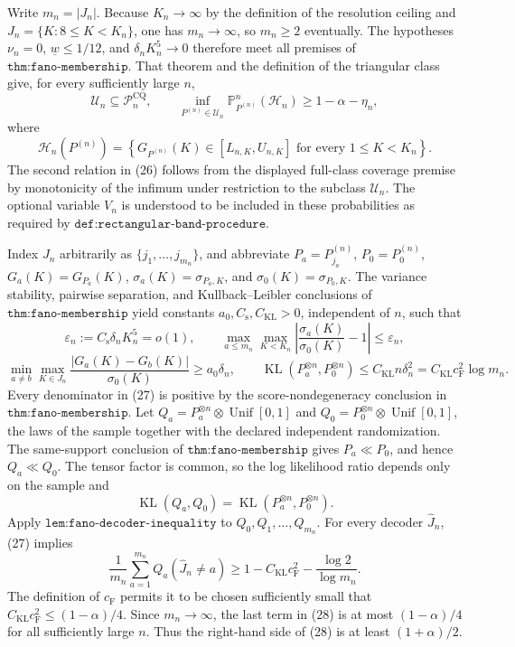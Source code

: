 Write \(m_n=|J_n|\).  Because \(K_n\to\infty\) by the definition of the resolution ceiling and \(J_n=\{K:8\leq K<K_n\}\), one has \(m_n\to\infty\), so \(m_n\geq2\) eventually.  The hypotheses \(\nu_n=0\), \(\underline w\leq1/12\), and \(\delta_nK_n^5\to0\) therefore meet all premises of \(\texttt{thm:fano-membership}\).  That theorem and the definition of the triangular class give, for every sufficiently large \(n\),
\[
 \mathcal U_n\subseteq\mathcal P_n^{\mathrm{CQ}},
 \qquad
 \inf_{P^{(n)}\in\mathcal U_n}\mathbb P_{P^{(n)}}^n(\mathcal H_n)
 \geq1-\alpha-\eta_n,                                      \tag{26}
\]
where
\[
 \mathcal H_n(P^{(n)})=
 \left\{G_{P^{(n)}}(K)\in[L_{n,K},U_{n,K}]
 \text{ for every }1\leq K<K_n\right\}.
\]
The second relation in (26) follows from the displayed full-class coverage premise by monotonicity of the infimum under restriction to the subclass \(\mathcal U_n\).  The optional variable \(V_n\) is understood to be included in these probabilities as required by \(\texttt{def:rectangular-band-procedure}\).

Index \(J_n\) arbitrarily as \(\{j_1,\ldots,j_{m_n}\}\), and abbreviate \(P_a=P_{j_a}^{(n)}\), \(P_0=P_0^{(n)}\), \(G_a(K)=G_{P_a}(K)\), \(\sigma_a(K)=\sigma_{P_a,K}\), and \(\sigma_0(K)=\sigma_{P_0,K}\).  The variance stability, pairwise separation, and Kullback--Leibler conclusions of \(\texttt{thm:fano-membership}\) yield constants \(a_0,C_{\mathrm s},C_{\mathrm{KL}}>0\), independent of \(n\), such that
\[
 \varepsilon_n:=C_{\mathrm s}\delta_nK_n^5=o(1),\qquad
 \max_{a\leq m_n}\max_{K<K_n}
 \left|\frac{\sigma_a(K)}{\sigma_0(K)}-1\right|\leq\varepsilon_n,
\]
\[
 \min_{a\neq b}\max_{K\in J_n}
 \frac{|G_a(K)-G_b(K)|}{\sigma_0(K)}\geq a_0\delta_n,
 \qquad
 \operatorname{KL}(P_a^{\otimes n},P_0^{\otimes n})
 \leq C_{\mathrm{KL}}n\delta_n^2
 =C_{\mathrm{KL}}c_{\mathrm F}^2\log m_n.                    \tag{27}
\]
Every denominator in (27) is positive by the score-nondegeneracy conclusion in \(\texttt{thm:fano-membership}\).  Let \(Q_a=P_a^{\otimes n}\otimes\operatorname{Unif}[0,1]\) and \(Q_0=P_0^{\otimes n}\otimes\operatorname{Unif}[0,1]\), the laws of the sample together with the declared independent randomization.  The same-support conclusion of \(\texttt{thm:fano-membership}\) gives \(P_a\ll P_0\), and hence \(Q_a\ll Q_0\).  The tensor factor is common, so the log likelihood ratio depends only on the sample and
\[
 \operatorname{KL}(Q_a,Q_0)=\operatorname{KL}(P_a^{\otimes n},P_0^{\otimes n}).
\]
Apply \(\texttt{lem:fano-decoder-inequality}\) to \(Q_0,Q_1,\ldots,Q_{m_n}\).  For every decoder \(\widehat J_n\), (27) implies
\[
 \frac1{m_n}\sum_{a=1}^{m_n}Q_a(\widehat J_n\neq a)
 \geq1-C_{\mathrm{KL}}c_{\mathrm F}^2-\frac{\log2}{\log m_n}. \tag{28}
\]
The definition of \(c_{\mathrm F}\) permits it to be chosen sufficiently small that \(C_{\mathrm{KL}}c_{\mathrm F}^2\leq(1-\alpha)/4\).  Since \(m_n\to\infty\), the last term in (28) is at most \((1-\alpha)/4\) for all sufficiently large \(n\).  Thus the right-hand side of (28) is at least \((1+\alpha)/2\).

